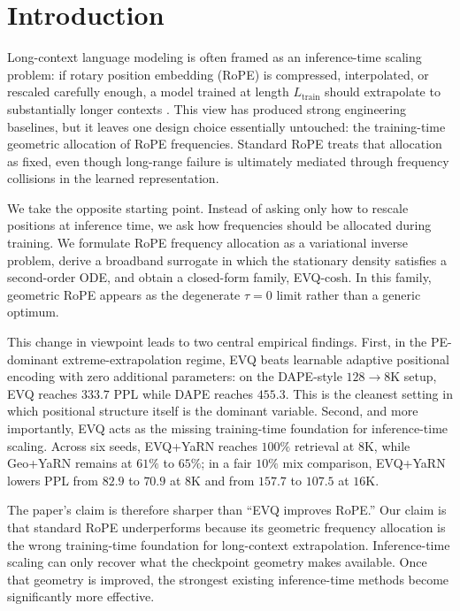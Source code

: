 \section{Introduction}

Long-context language modeling is often framed as an inference-time scaling problem: if rotary position embedding (RoPE) is compressed, interpolated, or rescaled carefully enough, a model trained at length \(L_{\text{train}}\) should extrapolate to substantially longer contexts \citep{chen2023position, peng2024yarn, ding2024longrope}. This view has produced strong engineering baselines, but it leaves one design choice essentially untouched: the training-time geometric allocation of RoPE frequencies. Standard RoPE treats that allocation as fixed, even though long-range failure is ultimately mediated through frequency collisions in the learned representation.

We take the opposite starting point. Instead of asking only how to rescale positions at inference time, we ask how frequencies should be allocated during training. We formulate RoPE frequency allocation as a variational inverse problem, derive a broadband surrogate in which the stationary density satisfies a second-order ODE, and obtain a closed-form family, EVQ-cosh. In this family, geometric RoPE appears as the degenerate \(\tau=0\) limit rather than a generic optimum.

This change in viewpoint leads to two central empirical findings. First, in the PE-dominant extreme-extrapolation regime, EVQ beats learnable adaptive positional encoding with zero additional parameters: on the DAPE-style \(128\!\rightarrow\!8\mathrm{K}\) setup, EVQ reaches \(333.7\) PPL while DAPE reaches \(455.3\). This is the cleanest setting in which positional structure itself is the dominant variable. Second, and more importantly, EVQ acts as the missing training-time foundation for inference-time scaling. Across six seeds, EVQ+YaRN reaches \(100\%\) retrieval at \(8\mathrm{K}\), while Geo+YaRN remains at \(61\%\) to \(65\%\); in a fair \(10\%\) mix comparison, EVQ+YaRN lowers PPL from \(82.9\) to \(70.9\) at \(8\mathrm{K}\) and from \(157.7\) to \(107.5\) at \(16\mathrm{K}\).

The paper's claim is therefore sharper than ``EVQ improves RoPE.'' Our claim is that standard RoPE underperforms because its geometric frequency allocation is the wrong training-time foundation for long-context extrapolation. Inference-time scaling can only recover what the checkpoint geometry makes available. Once that geometry is improved, the strongest existing inference-time methods become significantly more effective.


